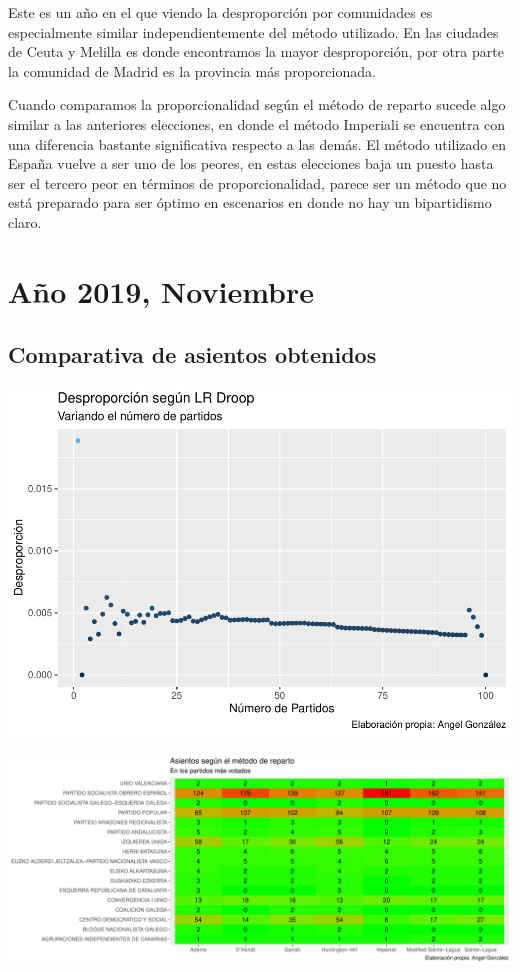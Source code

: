 \documentclass[12pt,a4paper,]{book}
\numberwithin{dummy}{section}
\theoremstyle{ocrenumbox}
\theoremstyle{blacknumex}
\theoremstyle{blacknumbox}
\theoremstyle{ocrenum}
\theoremstyle{ocrenum}
\begin{document}
Este es un año en el que viendo la desproporción por comunidades es
especialmente similar independientemente del método utilizado. En las
ciudades de Ceuta y Melilla es donde encontramos la mayor desproporción,
por otra parte la comunidad de Madrid es la provincia más proporcionada.

Cuando comparamos la proporcionalidad según el método de reparto sucede
algo similar a las anteriores elecciones, en donde el método Imperiali
se encuentra con una diferencia bastante significativa respecto a las
demás. El método utilizado en España vuelve a ser uno de los peores, en
estas elecciones baja un puesto hasta ser el tercero peor en términos de
proporcionalidad, parece ser un método que no está preparado para ser
óptimo en escenarios en donde no hay un bipartidismo claro.

\hypertarget{auxf1o-2019-noviembre}{%
\section{Año 2019, Noviembre}\label{auxf1o-2019-noviembre}}

\hypertarget{comparativa-de-asientos-obtenidos-14}{%
\subsection{Comparativa de asientos
obtenidos}\label{comparativa-de-asientos-obtenidos-14}}

\begin{center}\includegraphics[width=1\linewidth]{figurasR/unnamed-chunk-47-1} \end{center}

\begin{center}\includegraphics[width=1\linewidth]{figurasR/unnamed-chunk-47-2} \end{center}
\end{document}
